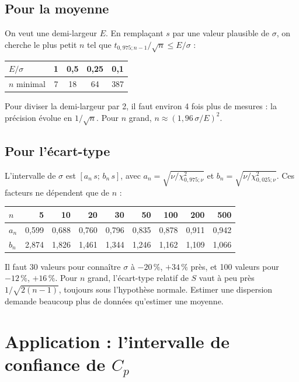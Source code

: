 \documentclass[11pt,a4paper]{article}
\theoremstyle{sj}
\theoremstyle{definition}
\theoremstyle{remark}
\newcommand{\chid}{\chi^2}
\begin{document}
\subsection{Pour la moyenne}

On veut une demi-largeur $E$. En remplaçant $s$ par une valeur plausible de $\sigma$, on cherche le plus petit $n$ tel que $t_{0{,}975;n-1}/\sqrt n\le E/\sigma$ :
\begin{center}
\begin{tabular}{l c c c c}
\toprule
$E/\sigma$ & 1 & 0,5 & 0,25 & 0,1\\
\midrule
$n$ minimal & 7 & 18 & 64 & 387\\
\bottomrule
\end{tabular}
\end{center}
Pour diviser la demi-largeur par 2, il faut environ 4 fois plus de mesures : la précision évolue en $1/\sqrt n$. Pour $n$ grand, $n\approx(1{,}96\,\sigma/E)^2$.

\subsection{Pour l'écart-type}

L'intervalle de $\sigma$ est $[a_n\,s;\,b_n\,s]$, avec $a_n=\sqrt{\nu/\chid_{0{,}975;\nu}}$ et $b_n=\sqrt{\nu/\chid_{0{,}025;\nu}}$. Ces facteurs ne dépendent que de $n$ :
\begin{center}
\small
\begin{tabular}{l r r r r r r r r}
\toprule
$n$ & 5 & 10 & 20 & 30 & 50 & 100 & 200 & 500\\
\midrule
$a_n$ & 0,599 & 0,688 & 0,760 & 0,796 & 0,835 & 0,878 & 0,911 & 0,942\\
$b_n$ & 2,874 & 1,826 & 1,461 & 1,344 & 1,246 & 1,162 & 1,109 & 1,066\\
\bottomrule
\end{tabular}
\end{center}
Il faut 30 valeurs pour connaître $\sigma$ à $-20\,\%$, $+34\,\%$ près, et 100 valeurs pour $-12\,\%$, $+16\,\%$. Pour $n$ grand, l'écart-type relatif de $S$ vaut à peu près $1/\sqrt{2(n-1)}$, toujours sous l'hypothèse normale. Estimer une dispersion demande beaucoup plus de données qu'estimer une moyenne.

\section{Application : l'intervalle de confiance de $C_p$}\label{sec:cp}
\end{document}

